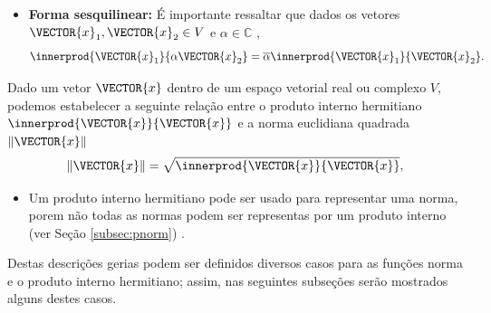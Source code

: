 \begin{tcbattention}
\begin{itemize}
\item \textbf{Forma sesquilinear:} 
É importante ressaltar que dados os vetores $\VECTOR{x}_1,\VECTOR{x}_2 \in V$ 
 e $\alpha \in \mathbb{C}$ \cite[pp. 242]{damiano2011course},
\begin{equation}
\innerprod{ \VECTOR{x}_1}{\alpha \VECTOR{x}_2} =\overline{\alpha} \innerprod{\VECTOR{x}_1}{\VECTOR{x}_2}.
\end{equation}

\end{itemize}
\end{tcbattention}

\begin{definition}
Dado um vetor $\VECTOR{x}$ dentro de um espaço vetorial real ou complexo $V$,
podemos estabelecer a seguinte relação entre o 
produto interno hermitiano $\innerprod{\VECTOR{x}}{\VECTOR{x}}$ e 
a norma euclidiana quadrada $\|\VECTOR{x}\|$ 
\cite[pp. 44]{d2019hermitian}  \cite[pp. 242]{damiano2011course}
\begin{equation}
\|\VECTOR{x}\|=\sqrt{\innerprod{\VECTOR{x}}{\VECTOR{x}}},
\end{equation} 
\end{definition}

\begin{tcbattention}
\begin{itemize}
\item Um produto interno hermitiano pode ser usado para representar uma norma,
porem não todas as normas podem ser representas por um produto interno 
(ver Seção \ref{subsec:pnorm}) \cite[pp. 45]{d2019hermitian}.
\end{itemize}
\end{tcbattention}

Destas descrições gerias podem ser definidos diversos casos para as funções
norma e o produto interno hermitiano; assim, 
nas seguintes subseções serão mostrados alguns destes casos.

